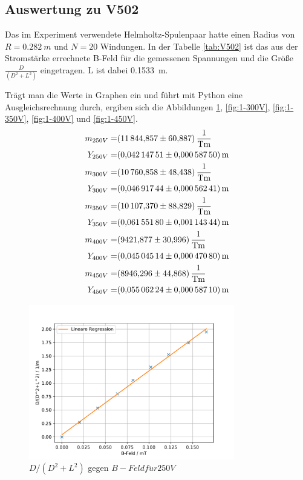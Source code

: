 \subsection{Auswertung zu V502}
Das im Experiment verwendete Helmholtz-Spulenpaar hatte einen Radius von $R = \SI{0,282}{m}$ und $N=20$ Windungen.
In der Tabelle \ref{tab:V502} ist das aus der Stromstärke errechnete B-Feld für die gemessenen Spannungen und die Größe $\frac{D}{(D^2+L^2)}$ eingetragen. L ist dabei \SI{0,1533}{m}.

Trägt man die Werte in Graphen ein und führt mit Python eine Ausgleichsrechnung durch, ergiben sich die Abbildungen  \ref{fig:1-250V}, \ref{fig:1-300V}, \ref{fig:1-350V}, \ref{fig:1-400V} und \ref{fig:1-450V}.
\begin{align*}
  m_{250V} =& \SI{11844,857\pm60,887}{\frac{1}{Tm}}\\
  Y_{250V} =& \SI{0,04214751\pm0,0005875}{m}\\
  m_{300V} =& \SI{10760,858\pm48,438}{\frac{1}{Tm}}\\
  Y_{300V} =& \SI{0,04691744\pm0,00056241}{m}\\
  m_{350V} =& \SI{10107,370\pm88,829}{\frac{1}{Tm}}\\
  Y_{350V} =& \SI{0,0615518\pm0,00114344}{m}\\
  m_{400V} =& \SI{ 9421,877\pm30,996}{\frac{1}{Tm}}\\
  Y_{400V} =& \SI{0,04504514\pm0,0004708}{m}\\
  m_{450V} =& \SI{ 8946,296\pm44,868}{\frac{1}{Tm}}\\
  Y_{450V} =& \SI{0,05506224\pm0,0005871}{m}
\end{align*}
\FloatBarrier
\begin{figure}[h!]
 \centering
 \includegraphics[width=0.8\textwidth]{1-250V.pdf}
 \caption{$D/(D^2+L^2)$ gegen $B-Feld f\ddot{u}r 250V$}
 \label{fig:1-250V}
\end{figure}
